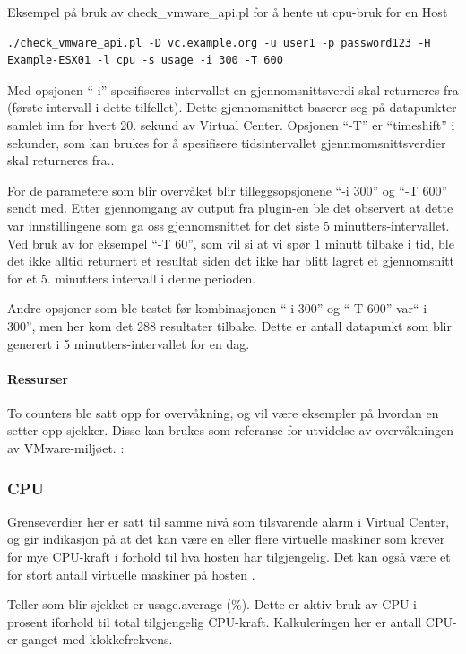 Eksempel på bruk av check\_vmware\_api.pl for å hente ut cpu-bruk for en Host
\begin{lstlisting}[style=example]
./check_vmware_api.pl -D vc.example.org -u user1 -p password123 -H Example-ESX01 -l cpu -s usage -i 300 -T 600
\end{lstlisting}

Med opsjonen ``-i'' spesifiseres intervallet en gjennomsnittsverdi skal returneres fra (første intervall i dette tilfellet). Dette gjennomsnittet baserer seg på datapunkter samlet inn for hvert 20. sekund av Virtual Center. Opsjonen ``-T''  er ``timeshift'' i sekunder, som kan brukes for å spesifisere tidsintervallet gjennmomsnittsverdier skal returneres fra.. 

For de parametere som blir overvåket blir tilleggsopsjonene ``-i 300'' og ``-T 600'' sendt med. Etter gjennomgang av output fra plugin-en ble det observert at dette var innstillingene som ga oss gjennomsnittet for det siste 5 minutters-intervallet. Ved bruk av for eksempel ``-T 60'', som vil si at vi spør 1 minutt tilbake i tid, ble det ikke alltid returnert et resultat siden det ikke har blitt lagret et gjennomsnitt for et 5. minutters intervall i denne perioden. 

Andre opsjoner som ble testet før kombinasjonen ``-i 300'' og ``-T 600'' var``-i 300'', men her kom det 288 resultater tilbake. Dette er antall datapunkt som blir generert i 5 minutters-intervallet for en dag. \cite{vmwareperfintervals}

\paragraph{Ressurser}
To counters ble satt opp for overvåkning, og vil være eksempler på hvordan en setter opp sjekker. Disse kan brukes som referanse for utvidelse av overvåkningen av VMware-miljøet.\cite{ciscovirtual} \cite{vmwaremonitoring}:

\subsubsection*{CPU}
Grenseverdier her er satt til samme nivå som tilsvarende alarm i Virtual Center, og gir indikasjon på at det kan være en eller flere virtuelle maskiner som krever for mye CPU-kraft i forhold til hva hosten har tilgjengelig. Det kan også være et for stort antall virtuelle maskiner på hosten \cite{vmwarecounters}.

Teller som blir sjekket er usage.average (\%). Dette er aktiv bruk av CPU i prosent iforhold til total tilgjengelig CPU-kraft. Kalkuleringen her er antall CPU-er ganget med klokkefrekvens.

